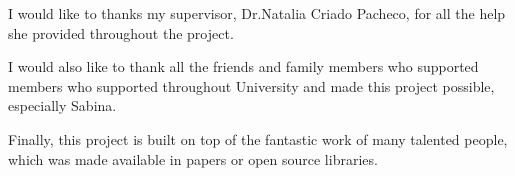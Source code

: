 I would like to thanks my supervisor, Dr.Natalia Criado Pacheco,
for all the help she provided throughout the project.

I would also like to thank all the friends and
family members who supported members who supported throughout
University and made this project possible, especially Sabina.

Finally, this project is built on top of the fantastic work of many
talented people, which was made available in papers or open source libraries. 